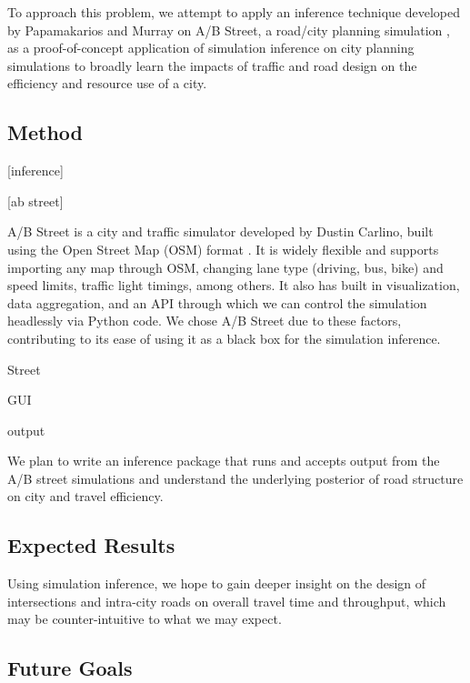\documentclass[]{article}
\begin{document}
To approach this problem, we attempt to apply an inference technique
 developed by Papamakarios and Murray \cite{Cranmer30055} on A/B Street, a
road/city planning simulation \cite{Carlino}, as a proof-of-concept
application of simulation inference on city planning simulations to
broadly learn the impacts of traffic and road design on the efficiency
and resource use of a city.

\hypertarget{method}{%
\subsection{Method}\label{method}}

{[}inference{]}

{[}ab street{]}

A/B Street is a city and traffic simulator developed by Dustin Carlino, 
built using the Open Street Map (OSM) format \cite{4653466}. It is widely flexible and
supports importing any map through OSM, changing lane type (driving, bus, bike) 
and speed limits, traffic light timings, among others. It also has built in 
visualization, data aggregation, and an API through which we can control the 
simulation headlessly via Python code. We chose A/B Street due to these factors, 
contributing to its ease of using it as a black box for the simulation inference. 

Street

GUI

output

We plan to write an inference package that runs and accepts output from
the A/B street simulations and understand the underlying posterior of
road structure on city and travel efficiency.

\hypertarget{expected-results}{%
\subsection{Expected Results}\label{expected-results}}

Using simulation inference, we hope to 
gain deeper insight on the design of intersections and intra-city roads
on overall travel time and throughput, which may be counter-intuitive to
what we may expect.

\hypertarget{future-goals}{%
\subsection{Future Goals}\label{future-goals}}
\end{document}
